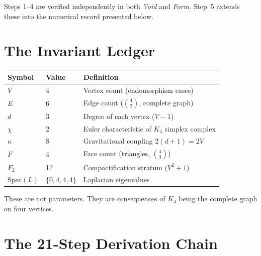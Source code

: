 \documentclass[11pt,a4paper]{article}
\theoremstyle{definition}
\begin{document}
Steps 1--4 are verified independently in both \textit{Void} and
\textit{Form}.  Step~5 extends these into the numerical record
presented below.

\section{The Invariant Ledger}
\label{sec:ledger}

\begin{center}
\renewcommand{\arraystretch}{1.3}
\begin{tabular}{@{}lll@{}}
\toprule
\textbf{Symbol} & \textbf{Value} & \textbf{Definition} \\
\midrule
$V$        & 4  & Vertex count (endomorphism cases) \\
$E$        & 6  & Edge count ($\binom{4}{2}$, complete graph) \\
$d$        & 3  & Degree of each vertex ($V - 1$) \\
$\chi$     & 2  & Euler characteristic of $K_4$ simplex complex \\
$\kappa$   & 8  & Gravitational coupling $2(d+1) = 2V$ \\
$F$        & 4  & Face count (triangles, $\binom{4}{3}$) \\
$F_2$      & 17 & Compactification stratum ($V^2 + 1$) \\
$\mathrm{Spec}(L)$ & $\{0, 4, 4, 4\}$ & Laplacian eigenvalues \\
\bottomrule
\end{tabular}
\end{center}

\noindent These are not parameters.  They are consequences of $K_4$ being the
complete graph on four vertices.

\section{The 21-Step Derivation Chain}
\label{sec:chain}
\end{document}
